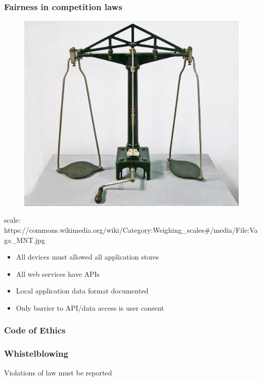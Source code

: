 \begin{frame}[fragile]
\frametitle{Fairness in competition laws}


\begin{figure}
\includegraphics[scale=0.1]{scale}
\end{figure}

\end{frame}

scale: https://commons.wikimedia.org/wiki/Category:Weighing_scales#/media/File:Vaga_MNT.jpg

\begin{itemize}
\item All devices must allowed all application stores
\item All web services have APIs
\item Local application data format documented
\item Only barrier to API/data access is user consent
\end{itemize}

\begin{frame}[fragile]
\frametitle{Code of Ethics}

\end{frame}


\begin{frame}[fragile]
\frametitle{Whistelblowing}

Violations of law must be reported

\end{frame}

